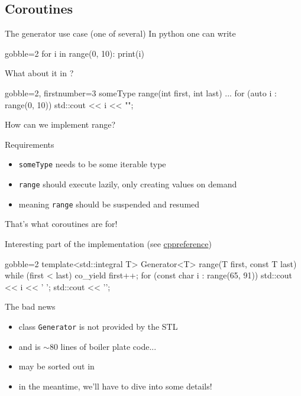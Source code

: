 \subsection{Coroutines}

\begin{frame}[fragile]
  \begin{block}{The generator use case (one of several)}
    In python one can write
    {\scriptsize
      \begin{pythoncode*}{gobble=2}
        for i in range(0, 10):
          print(i)
      \end{pythoncode*}
    }
    What about it in \cpp?
    {\scriptsize
      \begin{cppcode*}{gobble=2, firstnumber=3}
        someType range(int first, int last) { ... }
        for (auto i : range(0, 10)) {
          std::cout << i << "\n";
        }
      \end{cppcode*}
    }
    How can we implement range?
  \end{block}
  \begin{exampleblock}{Requirements}
    \begin{itemize}
    \item \texttt{someType} needs to be some iterable type
    \item \texttt{range} should execute lazily, only creating values on demand
    \item meaning \texttt{range} should be suspended and resumed
    \end{itemize}
    That's what coroutines are for!
  \end{exampleblock}
\end{frame}

\begin{frame}[fragile]
  \begin{exampleblock}{Interesting part of the implementation (see \href{https://en.cppreference.com/w/cpp/coroutine/coroutine\_handle\#Example}{\color{blue!50!white}cppreference})}
    {\scriptsize
      \begin{cppcode*}{gobble=2}
        template<std::integral T>
        Generator<T> range(T first, const T last) {
          while (first < last) {
            co_yield first++;
          }
        }
        for (const char i : range(65, 91)) {
          std::cout << i << ' ';
        }
        std::cout << '\n';
      \end{cppcode*}
    }
  \end{exampleblock}
  \begin{alertblock}{The bad news}
    \begin{itemize}
    \item class \texttt{Generator} is not provided by the STL
    \item and is $\sim80$ lines of boiler plate code...
    \item may be sorted out in 
    \item in the meantime, we'll have to dive into some details!
    \end{itemize}
  \end{alertblock}
\end{frame}

